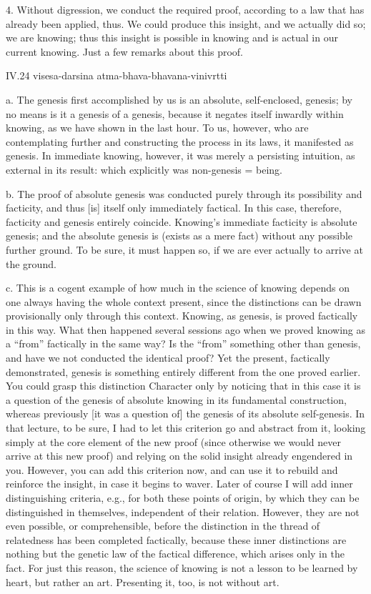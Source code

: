4. Without digression, we conduct the required proof,
according to a law that has already been applied, thus.
We could produce this insight,
and we actually did so; we are knowing;
thus this insight is possible in knowing
and is actual in our current knowing.
Just a few remarks about this proof.

IV.24
visesa-darsina atma-bhava-bhavana-vinivrtti

a. The genesis first accomplished by us is
an absolute, self-enclosed, genesis;
by no means is it a genesis of a genesis,
because it negates itself inwardly within knowing,
as we have shown in the last hour.
To us, however, who are contemplating further
and constructing the process in its laws,
it manifested as genesis.
In immediate knowing, however,
it was merely a persisting intuition,
as external in its result:
which explicitly was non-genesis = being.

b. The proof of absolute genesis was conducted purely
through its possibility and facticity,
and thus [is] itself only immediately factical.
In this case, therefore, facticity and genesis entirely coincide.
Knowing's immediate facticity is absolute genesis;
and the absolute genesis is (exists as a mere fact)
without any possible further ground.
To be sure, it must happen so,
if we are ever actually to arrive at the ground.

c. This is a cogent example of how much
in the science of knowing depends on one
always having the whole context present,
since the distinctions can be drawn
provisionally only through this context.
Knowing, as genesis, is proved factically in this way.
What then happened several sessions ago when
we proved knowing as a “from” factically in the same way?
Is the “from” something other than genesis,
and have we not conducted the identical proof?
Yet the present, factically demonstrated, genesis is
something entirely different from the one proved earlier.
You could grasp this distinction {Character} only by
noticing that in this case it is a question of
the genesis of absolute knowing in its fundamental construction,
whereas previously [it was a question of] the
genesis of its absolute self-genesis.
In that lecture, to be sure, I had to let this
criterion go and abstract from it,
looking simply at the core element of the new proof
(since otherwise we would never arrive at this new proof)
and relying on the solid insight already engendered in you.
However, you can add this criterion now,
and can use it to rebuild and reinforce the insight,
in case it begins to waver.
Later of course I will add inner distinguishing criteria,
e.g., for both these points of origin,
by which they can be distinguished in themselves,
independent of their relation.
However, they are not even possible, or comprehensible,
before the distinction in the thread of relatedness
has been completed factically,
because these inner distinctions are nothing but
the genetic law of the factical difference,
which arises only in the fact.
For just this reason, the science of knowing is
not a lesson to be learned by heart,
but rather an art. Presenting it, too, is not without art.


